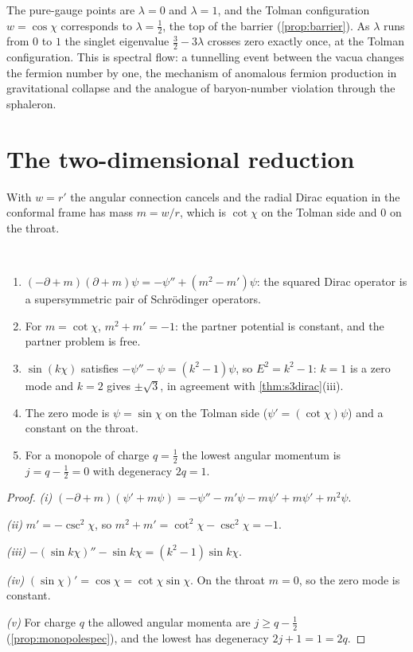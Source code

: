The pure-gauge points are $\lambda=0$ and $\lambda=1$, and the Tolman configuration $w=\cos\chi$ corresponds to $\lambda=\frac12$, the top of the barrier (\cref{prop:barrier}). As $\lambda$ runs from $0$ to $1$ the singlet eigenvalue $\frac32-3\lambda$ crosses zero exactly once, at the Tolman configuration. This is spectral flow: a tunnelling event between the vacua changes the fermion number by one, the mechanism of anomalous fermion production in gravitational collapse \cite{GibbonsSteif1993} and the analogue of baryon-number violation through the sphaleron.

\section{The two-dimensional reduction}

With $w=r'$ the angular connection cancels and the radial Dirac equation in the conformal frame has mass $m=w/r$, which is $\cot\chi$ on the Tolman side and $0$ on the throat.

\begin{proposition}\label{prop:susyqm}\ver\
\begin{enumerate}[label=(\roman*)]
\item $(-\partial+m)(\partial+m)\psi=-\psi''+(m^2-m')\psi$: the squared Dirac operator is a supersymmetric pair of Schr\"odinger operators.
\item For $m=\cot\chi$, $m^2+m'=-1$: the partner potential is constant, and the partner problem is free.
\item $\sin(k\chi)$ satisfies $-\psi''-\psi=(k^2-1)\psi$, so $E^2=k^2-1$: $k=1$ is a zero mode and $k=2$ gives $\pm\sqrt3$, in agreement with \cref{thm:s3dirac}(iii).
\item The zero mode is $\psi=\sin\chi$ on the Tolman side ($\psi'=(\cot\chi)\psi$) and a constant on the throat.
\item For a monopole of charge $q=\frac12$ the lowest angular momentum is $j=q-\frac12=0$ with degeneracy $2q=1$.
\end{enumerate}
\end{proposition}
\begin{proof}
\emph{(i)} $(-\partial+m)(\psi'+m\psi)=-\psi''-m'\psi-m\psi'+m\psi'+m^2\psi$.

\emph{(ii)} $m'=-\csc^2\chi$, so $m^2+m'=\cot^2\chi-\csc^2\chi=-1$.

\emph{(iii)} $-(\sin k\chi)''-\sin k\chi=(k^2-1)\sin k\chi$.

\emph{(iv)} $(\sin\chi)'=\cos\chi=\cot\chi\sin\chi$. On the throat $m=0$, so the zero mode is constant.

\emph{(v)} For charge $q$ the allowed angular momenta are $j\ge q-\frac12$ (\cref{prop:monopolespec}), and the lowest has degeneracy $2j+1=1=2q$.
\end{proof}


